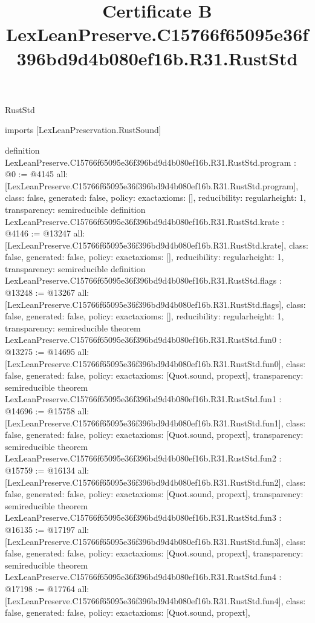 \begin{lexlean}{RustStd}
\title{Certificate B LexLeanPreserve.C15766f65095e36f396bd9d4b080ef16b.R31.RustStd}
\begin{coremodule}
imports [LexLeanPreservation.RustSound]

definition LexLeanPreserve.C15766f65095e36f396bd9d4b080ef16b.R31.RustStd.program : @0 := @4145 {
  all: [LexLeanPreserve.C15766f65095e36f396bd9d4b080ef16b.R31.RustStd.program],
  class: false,
  generated: false,
  policy: exact{axioms: []},
  reducibility: regular{height: 1},
  transparency: semireducible
}
definition LexLeanPreserve.C15766f65095e36f396bd9d4b080ef16b.R31.RustStd.krate : @4146 := @13247 {
  all: [LexLeanPreserve.C15766f65095e36f396bd9d4b080ef16b.R31.RustStd.krate],
  class: false,
  generated: false,
  policy: exact{axioms: []},
  reducibility: regular{height: 1},
  transparency: semireducible
}
definition LexLeanPreserve.C15766f65095e36f396bd9d4b080ef16b.R31.RustStd.flags : @13248 := @13267 {
  all: [LexLeanPreserve.C15766f65095e36f396bd9d4b080ef16b.R31.RustStd.flags],
  class: false,
  generated: false,
  policy: exact{axioms: []},
  reducibility: regular{height: 1},
  transparency: semireducible
}
theorem LexLeanPreserve.C15766f65095e36f396bd9d4b080ef16b.R31.RustStd.fun0 : @13275 := @14695 {
  all: [LexLeanPreserve.C15766f65095e36f396bd9d4b080ef16b.R31.RustStd.fun0],
  class: false,
  generated: false,
  policy: exact{axioms: [Quot.sound, propext]},
  transparency: semireducible
}
theorem LexLeanPreserve.C15766f65095e36f396bd9d4b080ef16b.R31.RustStd.fun1 : @14696 := @15758 {
  all: [LexLeanPreserve.C15766f65095e36f396bd9d4b080ef16b.R31.RustStd.fun1],
  class: false,
  generated: false,
  policy: exact{axioms: [Quot.sound, propext]},
  transparency: semireducible
}
theorem LexLeanPreserve.C15766f65095e36f396bd9d4b080ef16b.R31.RustStd.fun2 : @15759 := @16134 {
  all: [LexLeanPreserve.C15766f65095e36f396bd9d4b080ef16b.R31.RustStd.fun2],
  class: false,
  generated: false,
  policy: exact{axioms: [Quot.sound, propext]},
  transparency: semireducible
}
theorem LexLeanPreserve.C15766f65095e36f396bd9d4b080ef16b.R31.RustStd.fun3 : @16135 := @17197 {
  all: [LexLeanPreserve.C15766f65095e36f396bd9d4b080ef16b.R31.RustStd.fun3],
  class: false,
  generated: false,
  policy: exact{axioms: [Quot.sound, propext]},
  transparency: semireducible
}
theorem LexLeanPreserve.C15766f65095e36f396bd9d4b080ef16b.R31.RustStd.fun4 : @17198 := @17764 {
  all: [LexLeanPreserve.C15766f65095e36f396bd9d4b080ef16b.R31.RustStd.fun4],
  class: false,
  generated: false,
  policy: exact{axioms: [Quot.sound, propext]},
}
\end{coremodule}
\end{lexlean}
